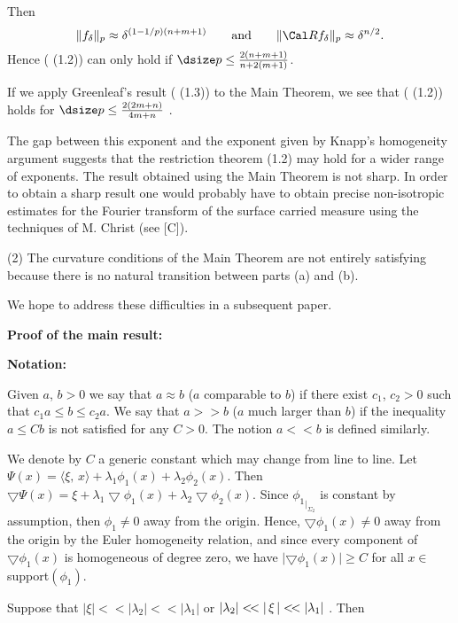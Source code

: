 \par
Then $$ 
\Vert{f_\delta}\Vert_p\approx \delta^{(1-1/p)(n+m+1)}\qquad
\text{and} \qquad \Vert{{\Cal R}f_\delta}\Vert_p \approx\delta^{n/2}.
$$
Hence ( (1.2)) can only hold if $\dsize p \leq \frac{2(n+m+1)}{n+2(m+1)}$.
\par
If we apply Greenleaf's result  ( (1.3)) to the Main Theorem, we see that 
( (1.2)) holds for $\dsize p\leq\frac{2(2m+n)}{4m+n}$ .
\par
The gap between this exponent and the exponent given by Knapp's homogeneity
argument suggests that the restriction theorem (1.2) may hold for a 
wider range of exponents. The result obtained using the Main Theorem is not 
sharp. In order to obtain a sharp result one would probably have to obtain
precise non-isotropic estimates for the Fourier transform of the
surface carried measure using the techniques of M. Christ (see [C]).
\par
\quad (2) The curvature conditions of the Main Theorem are not entirely
satisfying because there is no natural transition between parts (a) and (b).
\par
We hope to address these difficulties  in a subsequent paper.
\bigskip
\centerline{\bf Proof of the main result:}
\bigskip
\noindent
{\bf Notation:} \roster
\item
Given  $a$, $b > 0$ we say  that $a \approx b$ ($a$ comparable to $b$)
if there exist   $c_1$, $c_2 > 0$ such that 
$ 
c_1 a \leq b \leq c _ 2 a .
$
We say that  $a>\!>b$  ($a$  much larger than  $b$)  if  the inequality
$ a \leq  Cb$ is not satisfied for any $C >0$. The notion $a<\!<b$ is 
defined similarly.
\item
We   denote by $C$ a generic constant which may change from line to line.
\endroster
\bigskip
{} 
Let $\Psi(x) =\langle \xi,\, x\rangle +\lambda_1\phi_1(x)+\lambda_2\phi_2(x) 
.$ Then $\bigtriangledown\Psi(x) = \xi+\lambda_1\bigtriangledown\phi_1(x)  +
\lambda_2\bigtriangledown\phi_2(x)$. Since ${\phi_1}_{\vert_{\Sigma_2}}$  
is constant by assumption, then $\phi_1 \ne 0$ away from the origin. Hence, 
$\bigtriangledown\phi_1(x)\ne 0$ away from the origin by the Euler homogeneity 
relation, and since every
component of $\bigtriangledown\phi_1(x)$ is homogeneous of degree zero,
we have $\vert{\bigtriangledown\phi_1(x)}\vert \ge C$ for all $x \in$ support$(\phi_1)$.
\par
Suppose that  $ \vert\xi\vert<\!< \vert{\lambda_2}\vert<\!< \vert{\lambda_1}\vert$  or 
 $ \vert{\lambda_2}\vert<\!< \left\vert\,{\xi}\,\right\vert <\!< \vert{\lambda_1}\vert$ . Then  
